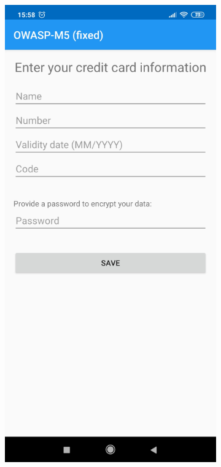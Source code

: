 \begin{figure}[htb!]
	\centering
	\begin{subfigure}{.3\textwidth}
  		\centering
  		\includegraphics[width=\linewidth]{imgs/secure_mobile_programming/app1_credit_card_form_empty.jpg}

\end{subfigure}
\end{figure}
